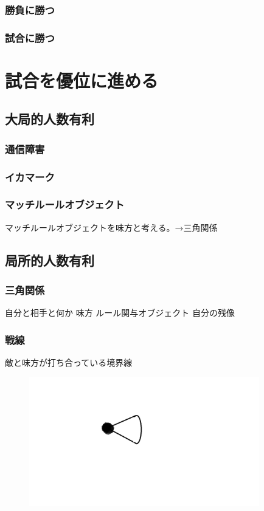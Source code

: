 \documentclass[a4paper,11pt]{jsbook}
\begin{document}
\section{勝負に勝つ}


\section{試合に勝つ}





\part{試合を優位に進める}
\chapter{大局的人数有利}
\section{通信障害}
\section{イカマーク}
\section{マッチルールオブジェクト}
マッチルールオブジェクトを味方と考える。→三角関係

\chapter{局所的人数有利}
\section{三角関係}
自分と相手と何か
味方
ルール関与オブジェクト
自分の残像



\section{戦線}
敵と味方が打ち合っている境界線
\begin{figure}
  \begin{center}
    \includegraphics[width=10cm]{resoource/player.png}
  \end{center}
\end{figure}
\end{document}
